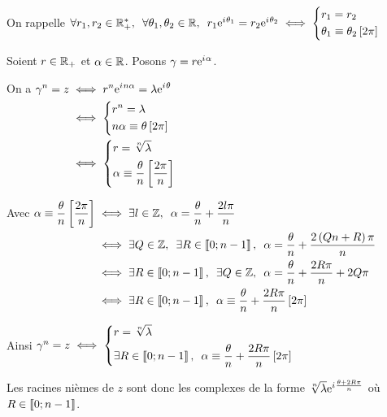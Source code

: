 \begin{dem}
On rappelle \(\quantifs{\forall r_1,r_2\in\Rps;\forall\theta_1,\theta_2\in\R}r_1\e{\i\theta_1}=r_2\e{\i\theta_2}\ssi\begin{dcases}r_1=r_2 \\ \theta_1\equiv\theta_2\croch{2\pi}\end{dcases}\)

Soient \(r\in\mathbb{R}_+\) et \(\alpha\in\mathbb{R}\). Posons \(\gamma=r\mathrm{e}^{i\mkern1mu\alpha}\).

On a \(\begin{aligned}[t]
\gamma^n=z&\iff r^n\mathrm{e}^{i\mkern1mu n\alpha}=\lambda\mathrm{e}^{i\mkern1mu\theta} \\
&\iff\begin{dcases}r^n=\lambda \\ n\alpha\equiv\theta\left[2\pi\right]\end{dcases} \\
&\iff\begin{dcases}r=\sqrt[n]{\lambda} \\ \alpha\equiv\dfrac{\theta}{n}\left[\dfrac{2\pi}{n}\right]\end{dcases}
\end{aligned}\)

Avec \(\begin{aligned}[t]
\alpha\equiv\dfrac{\theta}{n}\croch{\dfrac{2\pi}{n}}&\ssi\quantifs{\exists l\in\Z}\alpha=\dfrac{\theta}{n}+\dfrac{2l\pi}{n} \\
&\ssi\quantifs{\exists Q\in\Z;\exists R\in\interventierii{0}{n-1}}\alpha=\dfrac{\theta}{n}+\dfrac{2\paren{Qn+R}\pi}{n} \\
&\ssi\quantifs{\exists R\in\interventierii{0}{n-1};\exists Q\in\Z}\alpha=\dfrac{\theta}{n}+\dfrac{2R\pi}{n}+2Q\pi \\
&\ssi\quantifs{\exists R\in\interventierii{0}{n-1}}\alpha\equiv\dfrac{\theta}{n}+\dfrac{2R\pi}{n}\croch{2\pi}
\end{aligned}\)

Ainsi \(\gamma^n=z\ssi\begin{dcases}r=\sqrt[n]{\lambda} \\ \quantifs{\exists R\in\interventierii{0}{n-1}}\alpha\equiv\dfrac{\theta}{n}+\dfrac{2R\pi}{n}\croch{2\pi}\end{dcases}\)

Les racines nièmes de \(z\) sont donc les complexes de la forme \(\sqrt[n]{\lambda}\mathrm{e}^{i\mkern1mu\frac{\theta+2R\pi}{n}}\) où \(R\in\left\llbracket0;n-1\right\rrbracket\).
\end{dem}

